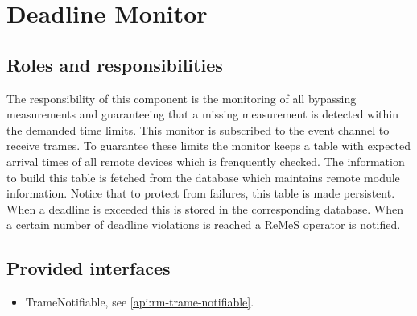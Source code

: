 \section{Deadline Monitor}
\label{element:rm-deadline-monitor}

\subsection{Roles and responsibilities}

\npar The responsibility of this component is the monitoring of all bypassing
measurements and guaranteeing that a missing measurement is detected within the
demanded time limits. This monitor is subscribed to the event channel to receive
trames. To guarantee these limits the monitor keeps a table with expected
arrival times of all remote devices which is frenquently checked. The
information to build this table is fetched from the database which maintains
remote module information. Notice that to protect from failures, this table is
made persistent. When a deadline is exceeded this is stored in the corresponding
database. When a certain number of deadline violations is reached a ReMeS
operator is notified.

\subsection{Provided interfaces}

\begin{itemize}
  \item TrameNotifiable, see \ref{api:rm-trame-notifiable}.
\end{itemize}